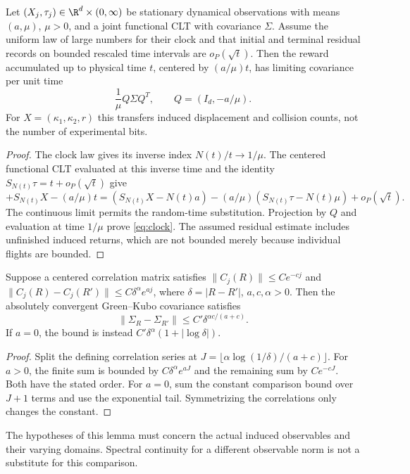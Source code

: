 \begin{proposition}\label{prop:clock}
Let $(X_j,\tau_j)\in\R^d\times(0,\infty)$ be stationary dynamical observations with means $(a,\mu)$, $\mu>0$, and a joint functional CLT with covariance $\Sigma$. Assume the uniform law of large numbers for their clock and that initial and terminal residual records on bounded rescaled time intervals are $o_P(\sqrt t)$. Then the reward accumulated up to physical time $t$, centered by $(a/\mu)t$, has limiting covariance per unit time
\begin{equation}\label{eq:clock}
 \frac1\mu Q\Sigma Q^T,\qquad Q=(I_d,-a/\mu).
\end{equation}
For $X=(\kappa_1,\kappa_2,r)$ this transfers induced displacement and collision counts, not the number of experimental bits.
\end{proposition}
\begin{proof}
The clock law gives its inverse index $N(t)/t\to1/\mu$. The centered functional CLT evaluated at this inverse time and the identity $S_{N(t)}\tau=t+o_P(\sqrt t)$ give
\[+ S_{N(t)}X-(a/\mu)t
 = (S_{N(t)}X-N(t)a)-(a/\mu)(S_{N(t)}\tau-N(t)\mu)+o_P(\sqrt t).
\]
The continuous limit permits the random-time substitution. Projection by $Q$ and evaluation at time $1/\mu$ prove \eqref{eq:clock}. The assumed residual estimate includes unfinished induced returns, which are not bounded merely because individual flights are bounded.
\end{proof}

\begin{lemma}\label{lem:covariance}
Suppose a centered correlation matrix satisfies $\|C_j(R)\|\le Ce^{-cj}$ and
$\|C_j(R)-C_j(R')\|\le C\delta^\alpha e^{a j}$, where $\delta=|R-R'|$, $a,c,\alpha>0$. Then the absolutely convergent Green--Kubo covariance satisfies
\[
 \|\Sigma_R-\Sigma_{R'}\|\le C'\delta^{\alpha c/(a+c)}.
\]
If $a=0$, the bound is instead $C'\delta^\alpha(1+|\log\delta|)$.
\end{lemma}
\begin{proof}
Split the defining correlation series at $J=\lfloor\alpha\log(1/\delta)/(a+c)\rfloor$. For $a>0$, the finite sum is bounded by $C\delta^\alpha e^{aJ}$ and the remaining sum by $Ce^{-cJ}$. Both have the stated order. For $a=0$, sum the constant comparison bound over $J+1$ terms and use the exponential tail. Symmetrizing the correlations only changes the constant.
\end{proof}
The hypotheses of this lemma must concern the actual induced observables and their varying domains. Spectral continuity for a different observable norm is not a substitute for this comparison.

